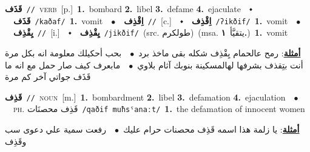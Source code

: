 \documentclass[10pt,a4paper,twoside]{article} %
\begin{document}
\begin{multicols}{2}
{\setlength\topsep{0pt}\textbf{\foreignlanguage{arabic}{قَذَف}}\ {\color{gray}\texttt{//}\color{black}}\ \textsc{verb}\ [p.]\ \textbf{1.}~bombard  \textbf{2.}~libel  \textbf{3.}~defame  \textbf{4.}~ejaculate\ \ $\smblkdiamond$\ \ \setlength\topsep{0pt}\textbf{\foreignlanguage{arabic}{قَذَف}}\ {\color{gray}\texttt{/kaðaf/}\color{black}}\ \textbf{1.}~vomit\ \ $\bullet$\ \ \setlength\topsep{0pt}\textbf{\foreignlanguage{arabic}{اِقْذِف}}\ {\color{gray}\texttt{//}\color{black}}\ [c.]\ \ $\smblkdiamond$\ \ \setlength\topsep{0pt}\textbf{\foreignlanguage{arabic}{اِقْذِف}}\ {\color{gray}\texttt{/ʔikðif/}\color{black}}\ \textbf{1.}~vomit\ \ $\bullet$\ \ \setlength\topsep{0pt}\textbf{\foreignlanguage{arabic}{يِقْذِف}}\ {\color{gray}\texttt{//}\color{black}}\ [i.]\ \ $\smblkdiamond$\ \ \setlength\topsep{0pt}\textbf{\foreignlanguage{arabic}{يِقْذِف}}\ {\color{gray}\texttt{/jikðif/}\color{black}}\ (src. \color{gray}\foreignlanguage{arabic}{طولكرم}\color{black})\ \color{gray}(msa. \foreignlanguage{arabic}{يتقيَّأ}~\foreignlanguage{arabic}{\textbf{١.}})\color{black}\ \textbf{1.}~vomit\  \begin{flushright}\color{gray}\foreignlanguage{arabic}{\textbf{\underline{\foreignlanguage{arabic}{أمثلة}}}: رمح عالحمام يِقْذِف شكله بقى ماخذ برد\ $\bullet$\ \  بحب أحكيلك معلومة انه بكل مرة أنت بتِقذف بشرفها لهالمسكينة بنوبك آثام بلاوي\ $\bullet$\ \  مابعرف كيف صار حمل مع انه ما قَذَف جواتي آخر كم مرة}\end{flushright}\color{black}} \vspace{2mm}

{\setlength\topsep{0pt}\textbf{\foreignlanguage{arabic}{قَذِف}}\ {\color{gray}\texttt{//}\color{black}}\ \textsc{noun}\ [m.]\ \textbf{1.}~bombardment  \textbf{2.}~libel  \textbf{3.}~defamation  \textbf{4.}~ejaculation\ \ $\bullet$\ \ \textsc{ph.} \color{gray} \foreignlanguage{arabic}{قَذِف محصنَات}\color{black}\ {\color{gray}\texttt{/{\sffamily qaðif muħsˤanaːt}/}\color{black}}\ \textbf{1.}~the defamation of innocent women\  \begin{flushright}\color{gray}\foreignlanguage{arabic}{\textbf{\underline{\foreignlanguage{arabic}{أمثلة}}}: يا زلمة هذا اسمه قَذِف محصنات حرام عليك\ $\bullet$\ \  رفعت سمية علي دعوى سب وقَذِف}\end{flushright}\color{black}} \vspace{2mm}


\end{multicols}
\end{document}
